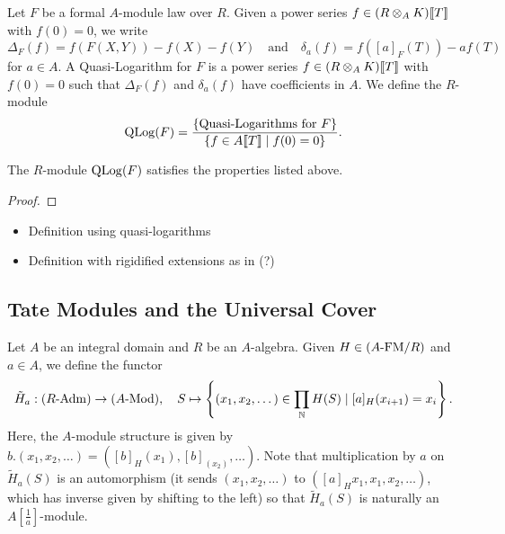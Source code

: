 \documentclass[../main.tex]{subfiles}
\begin{document}
\begin{defi}
  Let $F$ be a formal $A$-module law over $R$. Given a power series $f \in
  (R \otimes_A K)\llbracket T \rrbracket$ with $f(0) = 0$, we write 
  \begin{equation*}
    \Delta_F(f) = f(F(X,Y)) - f(X) - f(Y) \quad \text{and} \quad
    \delta_a (f) = f([a]_F(T)) - af(T)
  \end{equation*}
  for $a \in A$.
  A Quasi-Logarithm for $F$ is a power series $f \in (R \otimes_A K)\llbracket T \rrbracket$
  with $f(0) = 0$ such that $\Delta_F(f)$ and $\delta_a(f)$ have coefficients
  in $A$. We define the $R$-module
  \begin{equation*}
    \operatorname {QLog}(F) = \frac{\{\text{Quasi-Logarithms for $F$}\}}{\{f \in A\llbracket T
    \rrbracket \mid f(0) = 0\}}.
  \end{equation*}
\end{defi}

\begin{prop}
  The $R$-module $\operatorname {QLog}(F)$ satisfies the properties listed above. 
\begin{proof}
\end{proof}
\end{prop}

\begin{itemize}
  \item Definition using quasi-logarithms
  \item Definition with rigidified extensions as in \cite{hopkins1994equivariant} (?)
\end{itemize}

\subsection{Tate Modules and the Universal Cover} %
\label{sub:Tate Modules and the Universal Cover}
Let $A$ be an integral domain and $R$ be an $A$-algebra. Given $H \in {({A}\text-\mathrm{FM}/{R})}$ and $a \in A$,
we define the functor 
\begin{equation*}
  \Tilde H_a : {({R}\text-\mathrm{Adm})} \to {({A}\text-\mathrm{Mod})}, \quad
  S \mapsto \left\{(x_1, x_2, \dots) \in \prod_{\mathbb{N}} H(S) \mid [a]_H(x_{i+1}) =
  x_i \right\}.
\end{equation*}
Here, the $A$-module structure is given by $b.(x_1, x_2,\dots) = ([b]_H(x_1), [b]_(x_2),
\dots)$. Note that multiplication by $a$ on $\tilde H_a(S)$ is an automorphism
(it sends $(x_1, x_2, \dots)$ to $([a]_H x_1, x_1, x_2, \dots)$, which has inverse given
by shifting to the left)  so that $\tilde H_a(S)$ is naturally an
$A[\frac1a]$-module.
\end{document}
